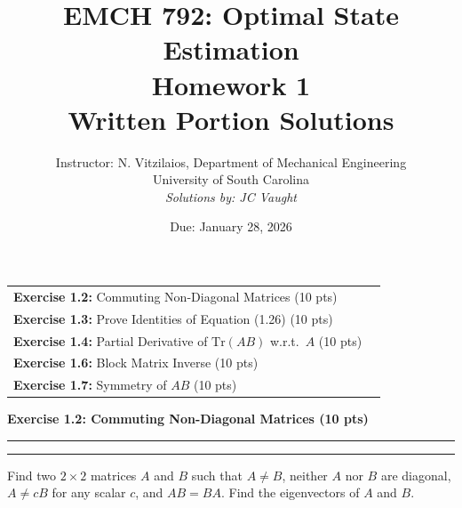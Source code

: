 \documentclass[12pt]{article}
\title{EMCH 792: Optimal State Estimation \\ Homework 1 \\ \large{Written Portion Solutions}}
\author{Instructor: N. Vitzilaios, Department of Mechanical Engineering \\ University of South Carolina \\ \textit{Solutions by: JC Vaught}}
\date{Due: January 28, 2026}
\newcommand{\question}[1]{%
  \clearpage
  \vspace{0.5cm}
  {\noindent\normalsize \textbf{#1}}
  \vspace{0.2cm}
  \hrule
  \vspace{0.1cm}
  \hrule
  \vspace{0.3cm}
}
\begin{document}
\maketitle
\setlength{\parindent}{0pt}



\begin{center}
\begin{tcolorbox}[colback=white, colframe=gray!50!black, colbacktitle=gray!20!white,
                  coltitle=black, sharp corners, boxrule=1pt,
                  title=\Large\bfseries Table of Contents]
\begin{tabular}{p{}r}
\textbf{Exercise 1.2:} Commuting Non-Diagonal Matrices (10 pts) \dotfill & \textbf{\pageref{quest:1.2}} \\[0.3em]
\textbf{Exercise 1.3:} Prove Identities of Equation (1.26) (10 pts) \dotfill & \textbf{\pageref{quest:1.3}} \\[0.3em]
\textbf{Exercise 1.4:} Partial Derivative of $\mathrm{Tr}(AB)$ w.r.t.\ $A$ (10 pts) \dotfill & \textbf{\pageref{quest:1.4}} \\[0.3em]
\textbf{Exercise 1.6:} Block Matrix Inverse (10 pts) \dotfill & \textbf{\pageref{quest:1.6}} \\[0.3em]
\textbf{Exercise 1.7:} Symmetry of $AB$ (10 pts) \dotfill & \textbf{\pageref{quest:1.7}} \\
\end{tabular}
\vspace{0.2cm}
\end{tcolorbox}
\end{center}

\vspace{0.5cm}


\question{Exercise 1.2: Commuting Non-Diagonal Matrices (10 pts)}\label{quest:1.2}

Find two $2 \times 2$ matrices $A$ and $B$ such that $A \neq B$, neither $A$ nor $B$ are diagonal, $A \neq cB$ for any scalar $c$, and $AB = BA$. Find the eigenvectors of $A$ and $B$.
\end{document}

